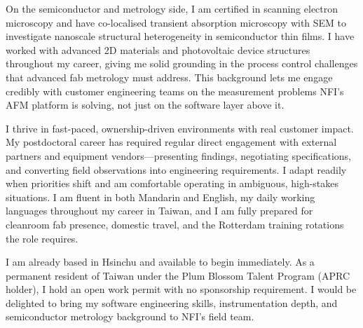\documentclass[11pt,a4paper]{moderncv}        %
\begin{document}
On the semiconductor and metrology side, I am certified in scanning electron
microscopy and have co-localised transient absorption microscopy with SEM
to investigate nanoscale structural heterogeneity in semiconductor thin films.
I have worked with advanced 2D materials and photovoltaic device structures
throughout my career, giving me solid grounding in the process control
challenges that advanced fab metrology must address. This background lets
me engage credibly with customer engineering teams on the measurement
problems NFI's AFM platform is solving, not just on the software layer
above it.

I thrive in fast-paced, ownership-driven environments with real customer
impact. My postdoctoral career has required regular direct engagement with
external partners and equipment vendors---presenting findings, negotiating
specifications, and converting field observations into engineering
requirements. I adapt readily when priorities shift and am comfortable
operating in ambiguous, high-stakes situations. I am fluent in both Mandarin
and English, my daily working languages throughout my career in Taiwan, and
I am fully prepared for cleanroom fab presence, domestic travel, and the
Rotterdam training rotations the role requires.

I am already based in Hsinchu and available to begin immediately. As a
permanent resident of Taiwan under the Plum Blossom Talent Program (APRC
holder), I hold an open work permit with no sponsorship requirement.
I would be delighted to bring my software engineering skills, instrumentation
depth, and semiconductor metrology background to NFI's field team.

\makeletterclosing

\end{document}
